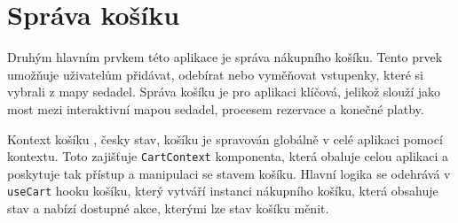 \section{Správa košíku}
\label{sec:implementace-kosik}
Druhým hlavním prvkem této aplikace je správa nákupního košíku.
Tento prvek umožňuje uživatelům přidávat, odebírat nebo vyměňovat vstupenky, které si vybrali z mapy sedadel.
Správa košíku je pro aplikaci klíčová, jelikož slouží jako most mezi interaktivní mapou sedadel, procesem rezervace a konečné platby.

\begin{subsection}{Kontext košíku}
    \label{subsec:implementace-kosik-kontext}
    , česky stav, košíku je spravován globálně v celé aplikaci pomocí kontextu.
    Toto zajišťuje \texttt{CartContext} komponenta, která obaluje celou aplikaci a poskytuje tak přístup a manipulaci se stavem košíku.
    Hlavní logika se odehrává v \texttt{useCart} hooku košíku, který vytváří instanci nákupního košíku, která obsahuje stav a nabízí dostupné akce, kterými lze stav košíku měnit.
\end{subsection}

